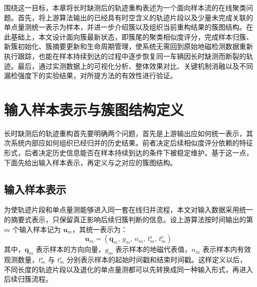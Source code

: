 \documentclass{xdupgthesis}
\begin{document}
围绕这一目标，本章将长时缺测后的轨迹重构表述为一个面向样本流的在线聚类问题。首先，将上游算法输出的已经具有时空含义的轨迹片段以及少量未完成关联的单点量测统一表示为样本，并进一步介绍簇以及组织当前重构结果的簇图结构。在此基础上，本文设计面向簇最新状态，即簇尾的聚类相似度评分，完成样本归簇、新簇初始化、簇摘要更新和生命周期管理，使系统无需回到原始地磁检测数据重新执行跟踪，也能在样本持续到达的过程中逐步恢复同一车辆因长时缺测而断裂的轨迹。最后，通过实测数据上的可视化分析、整体效果对比、关键机制消融以及不同漏检强度下的实验结果，对所提方法的有效性进行验证。

\section{输入样本表示与簇图结构定义}

长时缺测后的轨迹重构首先要明确两个问题，首先是上游输出应如何统一表示，其次系统内部应如何组织已经归并的历史结果。前者决定后续相似度评分依赖的特征形式，后者决定历史信息能否在样本持续到达的条件下被稳定维护。基于这一点，下面先给出输入样本表示，再定义与之对应的簇图结构。

\subsection{输入样本表示}

为使轨迹片段和单点量测能够进入同一套在线归并流程，本文对输入数据采用统一的摘要式表示，只保留真正影响后续归簇判断的信息。设上游算法按时间输出的第 $m$ 个输入样本记为 $\mathbf{u}_m$，其统一表示为：
\begin{equation}
	\mathbf{u}_m=
	\left(
	\mathbf{q}_m,\,
	g_m,\,
	n_m,\,
	t_m^{\mathrm{s}},\,
	t_m^{\mathrm{e}}
	\right)
\end{equation}
其中，$\mathbf{q}_m$ 表示样本的方向向量，$g_m$ 表示样本的地磁代表值，$n_m$ 表示样本内有效观测数量，$t_m^{\mathrm{s}}$ 与 $t_m^{\mathrm{e}}$ 分别表示样本的起始时间戳和结束时间戳。这样定义以后，不同长度的轨迹片段以及退化的单点量测都可以先转换成同一种输入形式，再进入后续归簇流程。
\end{document}
